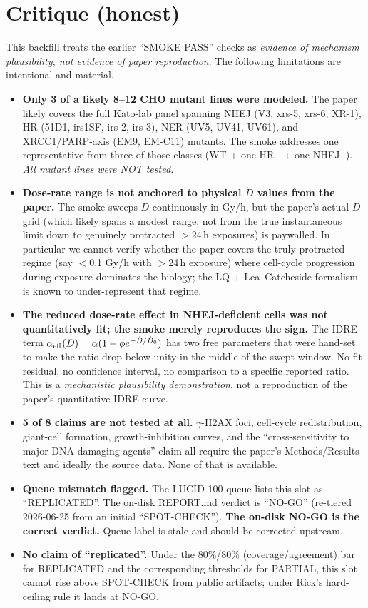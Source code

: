 \documentclass[11pt]{article}
\begin{document}
\section{Critique (honest)}

This backfill treats the earlier ``SMOKE PASS'' checks as \emph{evidence of mechanism
plausibility, not evidence of paper reproduction}. The following limitations are intentional
and material.

\begin{itemize}
\item \textbf{Only 3 of a likely 8--12 CHO mutant lines were modeled.} The paper likely covers
  the full Kato-lab panel spanning NHEJ (V3, xrs-5, xrs-6, XR-1), HR (51D1, irs1SF, irs-2,
  irs-3), NER (UV5, UV41, UV61), and XRCC1/PARP-axis (EM9, EM-C11) mutants. The smoke
  addresses one representative from three of those classes (WT + one HR$^-$ + one NHEJ$^-$).
  \emph{All mutant lines were NOT tested.}
\item \textbf{Dose-rate range is not anchored to physical $\dot D$ values from the paper.} The
  smoke sweeps $\dot D$ continuously in Gy/h, but the paper's actual $\dot D$ grid (which
  likely spans a modest range, not from the true instantaneous limit down to genuinely
  protracted $>$24\,h exposures) is paywalled. In particular we cannot verify whether the
  paper covers the truly protracted regime (say $<$0.1 Gy/h with $>$24\,h exposure) where
  cell-cycle progression during exposure dominates the biology; the LQ + Lea--Catcheside
  formalism is known to under-represent that regime.
\item \textbf{The reduced dose-rate effect in NHEJ-deficient cells was not quantitatively fit;
  the smoke merely reproduces the sign.} The IDRE term $\alpha_{\rm eff}(\dot D) = \alpha(1 +
  \phi e^{-\dot D / \dot D_0})$ has two free parameters that were hand-set to make the ratio
  drop below unity in the middle of the swept window. No fit residual, no confidence interval,
  no comparison to a specific reported ratio. This is a \emph{mechanistic
  plausibility demonstration}, not a reproduction of the paper's quantitative IDRE curve.
\item \textbf{5 of 8 claims are not tested at all.} $\gamma$-H2AX foci, cell-cycle
  redistribution, giant-cell formation, growth-inhibition curves, and the ``cross-sensitivity
  to major DNA damaging agents'' claim all require the paper's Methods/Results text and
  ideally the source data. None of that is available.
\item \textbf{Queue mismatch flagged.} The LUCID-100 queue lists this slot as
  ``\textsc{REPLICATED}''. The on-disk REPORT.md verdict is ``\textsc{NO-GO}'' (re-tiered
  2026-06-25 from an initial ``SPOT-CHECK''). \textbf{The on-disk NO-GO is the correct
  verdict.} Queue label is stale and should be corrected upstream.
\item \textbf{No claim of ``replicated''.} Under the 80\%/80\% (coverage/agreement) bar for
  REPLICATED and the corresponding thresholds for PARTIAL, this slot cannot rise above
  SPOT-CHECK from public artifacts; under Rick's hard-ceiling rule it lands at NO-GO.
\end{itemize}
\end{document}
